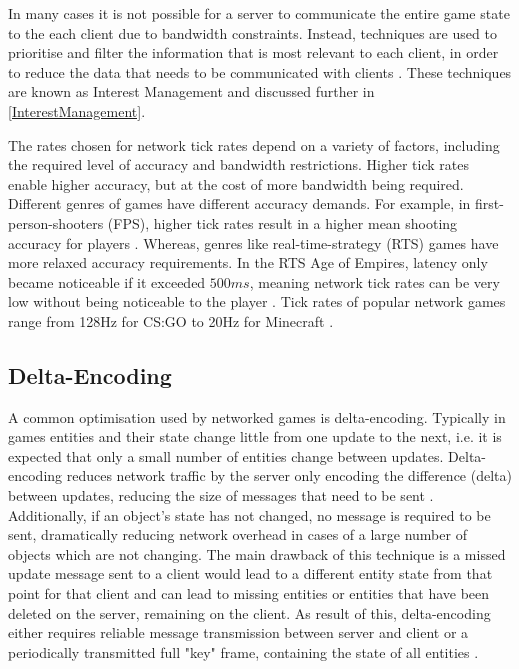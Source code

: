 In many cases it is not possible for a server to communicate the entire game state to the each client due to bandwidth constraints. Instead, techniques are used to prioritise and filter the information that is most relevant to each client, in order to reduce the data that needs to be communicated with clients \cite{pisan2004challenges}. These techniques are known as Interest Management and discussed further in \ref{InterestManagement}.

The rates chosen for network tick rates depend on a variety of factors, including the required level of accuracy and bandwidth restrictions. Higher tick rates enable higher accuracy, but at the cost of more bandwidth being required. Different genres of games have different accuracy demands. For example, in first-person-shooters (FPS), higher tick rates result in a higher mean shooting accuracy for players \cite{lee2015evaluation}. Whereas, genres like real-time-strategy (RTS) games have more relaxed accuracy requirements. In the RTS Age of Empires, latency only became noticeable if it exceeded $500ms$, meaning network tick rates can be very low without being noticeable to the player \cite{pisan2004challenges}. Tick rates of popular network games range from 128Hz for CS:GO to 20Hz for Minecraft \cite{metzger2016comprehensive}.

\subsection{Delta-Encoding}
A common optimisation used by networked games is delta-encoding. Typically in games entities and their state change little from one update to the next, i.e. it is expected that only a small number of entities change between updates. Delta-encoding reduces network traffic by the server only encoding the difference (delta) between updates, reducing the size of messages that need to be sent \cite{bharambe2006colyseus}. Additionally, if an object's state has not changed, no message is required to be sent, dramatically reducing network overhead in cases of a large number of objects which are not changing. The main drawback of this technique is a missed update message sent to a client would lead to a different entity state from that point for that client and can lead to missing entities or entities that have been deleted on the server, remaining on the client. As result of this, delta-encoding either requires reliable message transmission between server and client or a periodically transmitted full "key" frame, containing the state of all entities \cite{bharambe2004supporting}.

